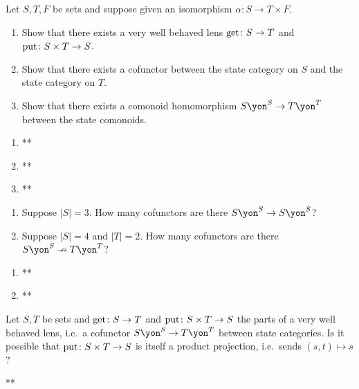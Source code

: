 \documentclass[Book-Poly]{subfiles}
\begin{document}
\begin{exercise}\label{exc.well_behaved_boring}
Let $S,T,F$ be sets and suppose given an isomorphism $\alpha\colon S\to T\times F$.
\begin{enumerate}
	\item Show that there exists a very well behaved lens $\mathrm{get}\colon S\to T$ and $\mathrm{put}\colon S\times T\to S$.
	\item Show that there exists a cofunctor between the state category on $S$ and the state category on $T$.
	\item Show that there exists a comonoid homomorphism $S\yon^S\to T\yon^T$ between the state comonoids.
\qedhere
\end{enumerate}
\begin{solution}
\begin{enumerate}
    \item **
    \item **
    \item **
\end{enumerate}
\end{solution}
\end{exercise}

\begin{exercise}\label{exc.how_many_vwbls}
\begin{enumerate}
	\item Suppose $|S|=3$. How many cofunctors are there $S\yon^S\to S\yon^S$?
	\item Suppose $|S|=4$ and $|T|=2$. How many cofunctors are there $S\yon^S\cof T\yon^T$?
\qedhere
\end{enumerate}
\begin{solution}
\begin{enumerate}
    \item **
    \item **
\end{enumerate}
\end{solution}
\end{exercise}

\begin{exercise}
Let $S,T$ be sets and $\mathrm{get}\colon S\to T$ and $\mathrm{put}\colon S\times T\to S$ the parts of a very well behaved lens, i.e.\ a cofunctor $S\yon^S\to T\yon^T$ between state categories. Is it possible that $\mathrm{put}\colon S\times T\to S$ is itself a product projection, i.e.\ sends $(s,t)\mapsto s$?
\begin{solution}
**
\end{solution}
\end{exercise}
\end{document}
